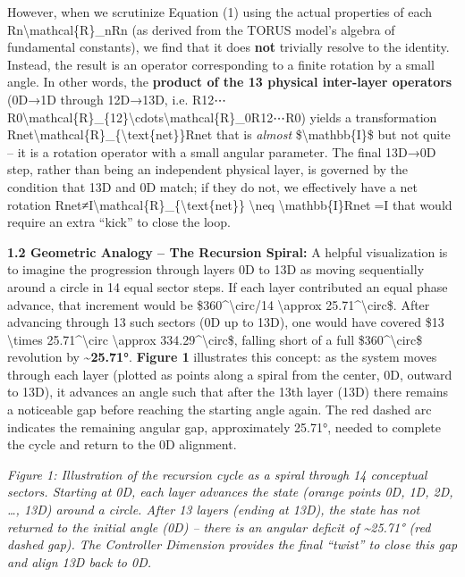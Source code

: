 \documentclass[
]{article}
\begin{document}
However, when we scrutinize Equation (1) using the actual properties of
each Rn\textbackslash mathcal\{R\}\_nRn\hspace{0pt} (as derived from the
TORUS model's algebra of fundamental constants), we find that it does
\textbf{not} trivially resolve to the identity. Instead, the result is
an operator corresponding to a finite rotation by a small angle. In
other words, the \textbf{product of the 13 physical inter-layer
operators} (0D→1D through 12D→13D, i.e.
R12⋯R0\textbackslash mathcal\{R\}\_\{12\}\textbackslash cdots\textbackslash mathcal\{R\}\_0R12\hspace{0pt}⋯R0\hspace{0pt})
yields a transformation
Rnet\textbackslash mathcal\{R\}\_\{\textbackslash text\{net\}\}Rnet\hspace{0pt}
that is \emph{almost} \$\textbackslash mathbb\{I\}\$ but not quite -- it
is a rotation operator with a small angular parameter. The final 13D→0D
step, rather than being an independent physical layer, is governed by
the condition that 13D and 0D match; if they do not, we effectively have
a net rotation
Rnet≠I\textbackslash mathcal\{R\}\_\{\textbackslash text\{net\}\}
\textbackslash neq \textbackslash mathbb\{I\}Rnet\hspace{0pt}=I that
would require an extra ``kick'' to close the loop.

\textbf{1.2 Geometric Analogy -- The Recursion Spiral:} A helpful
visualization is to imagine the progression through layers 0D to 13D as
moving sequentially around a circle in 14 equal sector steps. If each
layer contributed an equal phase advance, that increment would be
\$360\^{}\textbackslash circ/14 \textbackslash approx
25.71\^{}\textbackslash circ\$. After advancing through 13 such sectors
(0D up to 13D), one would have covered \$13 \textbackslash times
25.71\^{}\textbackslash circ \textbackslash approx
334.29\^{}\textbackslash circ\$, falling short of a full
\$360\^{}\textbackslash circ\$ revolution by
\textbf{\textasciitilde25.71°}. \textbf{Figure 1} illustrates this
concept: as the system moves through each layer (plotted as points along
a spiral from the center, 0D, outward to 13D), it advances an angle such
that after the 13th layer (13D) there remains a noticeable gap before
reaching the starting angle again. The red dashed arc indicates the
remaining angular gap, approximately 25.71°, needed to complete the
cycle and return to the 0D alignment.

\emph{Figure 1: Illustration of the recursion cycle as a spiral through
14 conceptual sectors. Starting at 0D, each layer advances the state
(orange points 0D, 1D, 2D, \ldots, 13D) around a circle. After 13 layers
(ending at 13D), the state has not returned to the initial angle (0D) --
there is an angular deficit of \textasciitilde25.71° (red dashed gap).
The Controller Dimension provides the final ``twist'' to close this gap
and align 13D back to 0D.}
\end{document}
